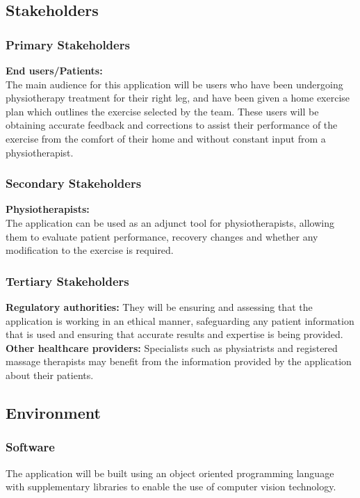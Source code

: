 \documentclass{article}
\begin{document}
\subsection{Stakeholders}
  \subsubsection{Primary Stakeholders}
    \textbf{End users/Patients:} \\
      The main audience for this application will be users who have been undergoing physiotherapy treatment for their right leg, and have been given a home exercise plan which outlines the exercise selected by the team. 
      These users will be obtaining accurate feedback and corrections to assist their performance of the exercise from the comfort of their home and without constant input from a physiotherapist.
     
  \subsubsection{Secondary Stakeholders}
    \textbf{Physiotherapists:} \\
      The application can be used as an adjunct tool for physiotherapists, allowing them to evaluate patient performance, recovery changes and whether any modification to the exercise is required. \\
      
  \subsubsection{Tertiary Stakeholders}
    \textbf{Regulatory authorities:}
      They will be ensuring and assessing that the application is working in an ethical manner, safeguarding any patient information that is used and ensuring that accurate results and expertise is being provided. \\
    \textbf{Other healthcare providers:}
       Specialists such as physiatrists and registered massage therapists may benefit from the information provided by the application about their patients. 

\subsection{Environment}
  \subsubsection{Software}
    The application will be built using an object oriented programming language with supplementary libraries to enable the use of computer vision technology. \\
\end{document}
